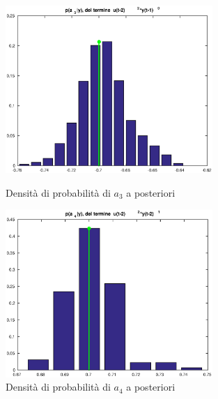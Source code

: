 \documentclass[10pt,a4paper,oneside,openany,noindent]{report}
\begin{document}
\begin{figure}[ht]
\centering
\begin{minipage}[b]{0.45\linewidth}
\centering
\includegraphics[width=0.7\textwidth]{ak_3.eps}
\caption{Densità di probabilità di $a_3$ a posteriori}
\label{fig:minipage1}
\end{minipage}
\quad
\begin{minipage}[b]{0.45\linewidth}
\centering
\includegraphics[width=0.7\textwidth]{ak_4.eps}
\caption{Densità di probabilità di $a_4$ a posteriori}
\label{fig:minipage2}
\end{minipage}
\end{figure}
\end{document}
